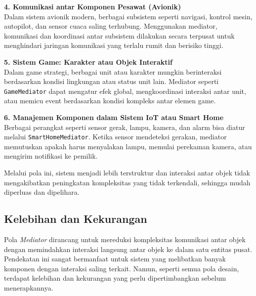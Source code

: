 \textbf{4. Komunikasi antar Komponen Pesawat (Avionik)} \\
Dalam sistem avionik modern, berbagai subsistem seperti navigasi, kontrol mesin, autopilot, dan sensor cuaca saling terhubung. Menggunakan mediator, komunikasi dan koordinasi antar subsistem dilakukan secara terpusat untuk menghindari jaringan komunikasi yang terlalu rumit dan berisiko tinggi.

\textbf{5. Sistem Game: Karakter atau Objek Interaktif} \\
Dalam game strategi, berbagai unit atau karakter mungkin berinteraksi berdasarkan kondisi lingkungan atau status unit lain. Mediator seperti \texttt{GameMediator} dapat mengatur efek global, mengkoordinasi interaksi antar unit, atau memicu event berdasarkan kondisi kompleks antar elemen game.

\textbf{6. Manajemen Komponen dalam Sistem IoT atau Smart Home} \\
Berbagai perangkat seperti sensor gerak, lampu, kamera, dan alarm bisa diatur melalui \texttt{SmartHomeMediator}. Ketika sensor mendeteksi gerakan, mediator memutuskan apakah harus menyalakan lampu, memulai perekaman kamera, atau mengirim notifikasi ke pemilik.

Melalui pola ini, sistem menjadi lebih terstruktur dan interaksi antar objek tidak mengakibatkan peningkatan kompleksitas yang tidak terkendali, sehingga mudah diperluas dan dipelihara.

\subsection{Kelebihan dan Kekurangan}

Pola \textit{Mediator} dirancang untuk mereduksi kompleksitas komunikasi antar objek dengan memindahkan interaksi langsung antar objek ke dalam satu entitas pusat. Pendekatan ini sangat bermanfaat untuk sistem yang melibatkan banyak komponen dengan interaksi saling terkait. Namun, seperti semua pola desain, terdapat kelebihan dan kekurangan yang perlu dipertimbangkan sebelum menerapkannya.

